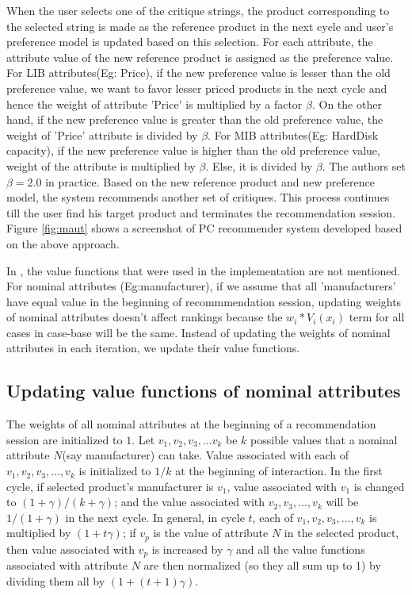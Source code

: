 When the user selects one of the critique strings, the product corresponding to the selected string is made as the reference product in the next cycle and user's preference model is updated based on this selection.
For each attribute, the attribute value of the new reference product is assigned as the preference value.
For LIB attributes(Eg: Price), if the new preference value is lesser than the old preference value, we want to favor lesser priced products in the next cycle and hence the weight of attribute 'Price' is multiplied by a factor $\beta$.
On the other hand, if the new preference value is greater than the old preference value, the weight of 'Price' attribute is divided by $\beta$.
For MIB attributes(Eg: HardDisk capacity), if the new preference value is higher than the old preference value, weight of the attribute is multiplied by $\beta$. Else, it is divided by $\beta$.
The authors set $\beta = 2.0$ in practice.
Based on the new reference product and new preference model, the system recommends another set of critiques.
This process continues till the user find his target product and terminates the recommendation session.
Figure \ref{fig:maut} shows a screenshot of PC recommender system developed based on the above approach.

In \cite{mautPaper}, the value functions that were used in the implementation are not mentioned.
For nominal attributes (Eg:manufacturer), if we assume that all 'manufacturers' have equal value in the beginning of recommmendation session, updating weights of nominal attributes doesn't affect rankings because the $w_i*V_i(x_i)$ term for all cases in case-base will be the same.
Instead of updating the weights of nominal attributes in each iteration, we update their value functions.
\subsection{Updating value functions of nominal attributes}
\label{sec:valueFunc}
The weights of all nominal attributes at the beginning of a recommendation session are initialized to $1$.
Let $v_1, v_2, v_3,\hdots v_k$ be $k$ possible values that a nominal attribute $N$(say manufacturer) can take.
Value associated with each of $v_1, v_2, v_3,\hdots, v_k$ is initialized to $1/k$ at the beginning of interaction.
In the first cycle, if selected product's manufacturer is $v_1$, value associated with $v_1$ is changed to $(1+\gamma)/(k+\gamma)$; and the value associated with $v_2, v_3, \hdots, v_k$ will be $1/(1+\gamma)$ in the next cycle.
In general, in cycle $t$,  each of $v_1, v_2, v_3,\hdots, v_k$ is multiplied by $(1 + t\gamma)$; if $v_p$ is the value of attribute $N$ in the selected product, then value associated with $v_p$ is increased by $\gamma$ and all the value functions associated with attribute $N$ are then normalized (so they all sum up to 1)  by dividing them all by $(1+ (t+1)\gamma)$.


